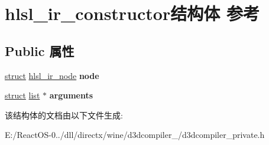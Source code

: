 \hypertarget{structhlsl__ir__constructor}{}\section{hlsl\+\_\+ir\+\_\+constructor结构体 参考}
\label{structhlsl__ir__constructor}
\subsection*{Public 属性}
\begin{DoxyCompactItemize}
\item 
\mbox{\label{structhlsl__ir__constructor_ac5b24157720d3d2faba453ec1b98e89e}} 
\hyperlink{interfacestruct}{struct} \hyperlink{structhlsl__ir__node}{hlsl\+\_\+ir\+\_\+node} {\bfseries node}
\item 
\mbox{\label{structhlsl__ir__constructor_afdf7e265c3c881f0e88d97c2f1a83570}} 
\hyperlink{interfacestruct}{struct} \hyperlink{classlist}{list} $\ast$ {\bfseries arguments}
\end{DoxyCompactItemize}


该结构体的文档由以下文件生成\+:\begin{DoxyCompactItemize}
\item 
E\+:/\+React\+O\+S-\/0../dll/directx/wine/d3dcompiler\+\_/d3dcompiler\+\_\+private.\+h\end{DoxyCompactItemize}
